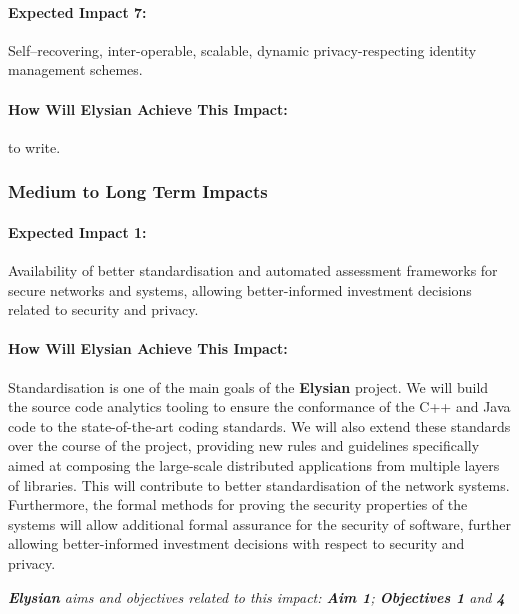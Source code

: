 \documentclass[a4paper,11pt]{article}
\newcommand{\project}[1]{\textbf{#1}\xspace}
\newcommand{\SECURITY}{\project{Elysian}}
\newcommand{\TheProject}{\SECURITY}
\begin{document}
\begin{mdframed}[backgroundcolor=blue!5]
\paragraph{Expected Impact 7:}
Self–recovering, inter-operable, scalable, dynamic privacy-respecting identity management schemes.
\end{mdframed}

\begin{mdframed}[backgroundcolor=gray!10]
\paragraph{How Will \TheProject{} Achieve This Impact:}
\COGNI to write.
\end{mdframed}

\subsubsection{Medium to Long Term Impacts}

\begin{mdframed}[backgroundcolor=blue!5]
\paragraph{Expected Impact 1:}
Availability of better standardisation and automated assessment frameworks for secure networks and systems, allowing better-informed investment decisions related to security and privacy.
\end{mdframed}

\begin{mdframed}[backgroundcolor=gray!10]
\paragraph{How Will \TheProject{} Achieve This Impact:}
Standardisation is one of the main goals of the \TheProject{} project. We will build the source code analytics tooling to ensure the conformance of the C++ and Java code to the state-of-the-art coding standards. We will also extend these standards over the course of the project, providing new rules and guidelines specifically aimed at composing the large-scale distributed applications from multiple layers of libraries. This will contribute to better standardisation of the network systems. Furthermore, the formal methods for proving the security properties of the systems will allow additional formal assurance for the security of software, further allowing better-informed investment decisions with respect to security and privacy.

\emph{\TheProject{} aims and objectives related to this impact: \textbf{Aim 1}; \textbf{Objectives 1} and \textbf{4}}

\end{mdframed}
\end{document}
